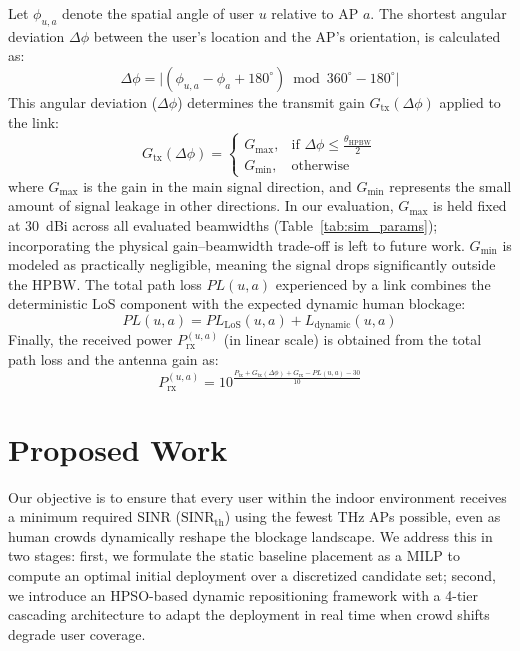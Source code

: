 \documentclass[conference]{IEEEtran}
\begin{document}
Let $\phi_{u,a}$ denote the spatial angle of user $u$ relative to AP $a$. The shortest angular deviation $\Delta\phi$ between the user's location and the AP's orientation, is calculated as:
\begin{equation}
    \Delta\phi = \big|(\phi_{u,a} - \phi_a + 180^{\circ}) \bmod 360^{\circ} - 180^{\circ}\big|
    \label{eq:ang_dev}
\end{equation}
This angular deviation ($\Delta\phi$) determines the transmit gain $G_{\text{tx}}(\Delta\phi)$ applied to the link:
\begin{equation}
    G_{\text{tx}}(\Delta\phi) = 
    \begin{cases} 
      G_{\text{max}}, & \text{if } \Delta\phi \le \frac{\theta_{\text{HPBW}}}{2} \\
      G_{\text{min}}, & \text{otherwise}
    \end{cases}
    \label{eq:beamwidth}
\end{equation}
where $G_{\text{max}}$ is the gain in the main signal direction, and $G_{\text{min}}$ represents the small amount of signal leakage in other directions. In our evaluation, $G_{\text{max}}$ is held fixed at 30~dBi across all evaluated beamwidths (Table~\ref{tab:sim_params}); incorporating the physical gain--beamwidth trade-off is left to future work. $G_{\text{min}}$ is modeled as practically negligible, meaning the signal drops significantly outside the HPBW. The total path loss $PL(u,a)$ experienced by a link combines the deterministic LoS component with the expected dynamic human blockage:
\begin{equation}
    PL(u,a) = PL_{\text{LoS}}(u,a) + L_{\text{dynamic}}(u,a)
    \label{eq:total_pl_combined}
\end{equation}
Finally, the received power $P_{\text{rx}}^{(u,a)}$ (in linear scale) is obtained from the total path loss and the antenna gain as:
\begin{equation}
    P_{\text{rx}}^{(u,a)} = 10^{\frac{P_{\text{tx}} + G_{\text{tx}}(\Delta\phi) + G_{\text{rx}} - PL(u,a) - 30}{10}}
\end{equation}

\section{Proposed Work}

Our objective is to ensure that every user within the indoor environment receives a minimum required SINR ($\text{SINR}_{\text{th}}$) using the fewest THz APs possible, even as human crowds dynamically reshape the blockage landscape. We address this in two stages: first, we formulate the static baseline placement as a MILP to compute an optimal initial deployment over a discretized candidate set; second, we introduce an HPSO-based dynamic repositioning framework with a 4-tier cascading architecture to adapt the deployment in real time when crowd shifts degrade user coverage.
\end{document}
